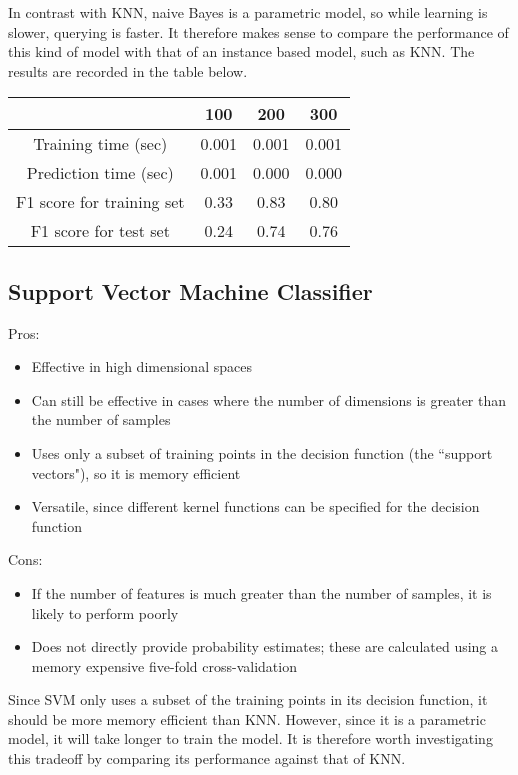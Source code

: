 \documentclass[12 pt]{article}
\numberwithin{equation}{section}
\begin{document}
In contrast with KNN, naive Bayes is a parametric model, so while learning is slower, querying is faster. It therefore makes sense to compare the performance of this kind of model with that of an instance based model, such as  KNN. The results are recorded in the table below.

\begin{center}
  \begin{tabular}{| c | c | c | c | }
    \hline
    & 100 & 200 & 300 \\ \hline
    Training time (sec) & 0.001 & 0.001 & 0.001 \\ \hline
    Prediction time (sec) & 0.001 & 0.000 & 0.000 \\ \hline 
    F1 score for training set & 0.33 & 0.83 & 0.80 \\ \hline
    F1 score for test set & 0.24 & 0.74 & 0.76\\ \hline
  \end{tabular}
\end{center}

\subsection{Support Vector Machine Classifier}
Pros:
\begin{itemize}
	\item Effective in high dimensional spaces
	\item Can still be effective in cases where the number of dimensions is greater than the number of samples
	\item Uses only a subset of training points in the decision function (the ``support vectors"), so it is memory efficient
	\item Versatile, since different kernel functions can be specified for the decision function
\end{itemize}
Cons:
\begin{itemize}
	\item If the number of features is much greater than the number of samples, it is likely to perform poorly
	\item Does not directly provide probability estimates; these are calculated using a memory expensive five-fold cross-validation
\end{itemize}

Since SVM only uses a subset of the training points in its decision function, it should be more memory efficient than KNN. However, since it is a parametric model, it will take longer to train the model. It is therefore worth investigating this tradeoff by comparing its performance against that of KNN.
\end{document}

